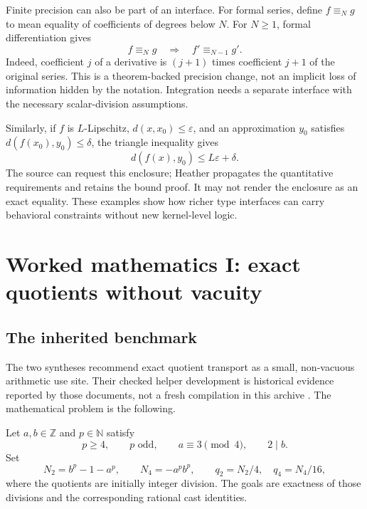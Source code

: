 \documentclass[11pt,letterpaper]{article}
\newcommand{\N}{\mathbb N}\newcommand{\Z}{\mathbb Z}\newcommand{\Q}{\mathbb Q}\newcommand{\R}{\mathbb R}
\theoremstyle{definition}\newtheorem{definition}[theorem]{Definition}
\theoremstyle{remark}\newtheorem{remark}[theorem]{Remark}
\begin{document}
Finite precision can also be part of an interface. For formal series, define
$f\equiv_Ng$ to mean equality of coefficients of degrees below $N$. For $N\ge1$,
formal differentiation gives
\[
 f\equiv_Ng\quad\Longrightarrow\quad f'\equiv_{N-1}g'.
\]
Indeed, coefficient $j$ of a derivative is $(j+1)$ times coefficient $j+1$ of
the original series. This is a theorem-backed precision change, not an implicit
loss of information hidden by the notation. Integration needs a separate
interface with the necessary scalar-division assumptions.

Similarly, if $f$ is $L$-Lipschitz, $d(x,x_0)\le\varepsilon$, and an approximation
$y_0$ satisfies $d(f(x_0),y_0)\le\delta$, the triangle inequality gives
\[
 d(f(x),y_0)\le L\varepsilon+\delta.
\]
The source can request this enclosure; Heather propagates the quantitative
requirements and retains the bound proof. It may not render the enclosure as
an exact equality. These examples show how richer type interfaces can carry
behavioral constraints without new kernel-level logic.

\section{Worked mathematics I: exact quotients without vacuity}\label{sec:frey}

\subsection{The inherited benchmark}
The two syntheses recommend exact quotient transport as a small, non-vacuous
arithmetic use site. Their checked helper development is historical evidence
reported by those documents, not a fresh compilation in this archive
\cite{round3a,round3b}. The mathematical problem is the following.

Let $a,b\in\Z$ and $p\in\N$ satisfy
\begin{equation}\label{eq:frey-assumptions}
 p\ge4,\qquad p\text{ odd},\qquad a\equiv3\pmod4,\qquad 2\mid b.
\end{equation}
Set
\[
 N_2=b^p-1-a^p,\qquad N_4=-a^pb^p,
 \qquad q_2=N_2/4,\quad q_4=N_4/16,
\]
where the quotients are initially integer division. The goals are exactness
of those divisions and the corresponding rational cast identities.
\end{document}
